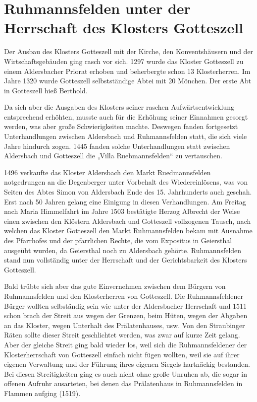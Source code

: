 \documentclass[12pt,a4paper]{book}
\begin{document}
\section[Unter dem Kloster Gotteszell]{Ruhmannsfelden unter der
Herrschaft des Klosters Gotteszell}

Der Ausbau des Klosters Gotteszell mit der Kirche, den Konventshäusern
und der Wirtschaftsgebäuden ging rasch vor sich. 1297 wurde das Kloster
Gotteszell zu einem Aldersbacher Priorat erhoben und beherbergte schon
13 Klosterherren. Im Jahre 1320 wurde Gotteszell selbstständige Abtei
mit 20 Mönchen. Der erste Abt in Gotteszell hieß Berthold.

Da sich aber die Ausgaben des Klosters seiner raschen
Aufwärtsentwicklung entsprechend erhöhten, musste auch für die Erhöhung
seiner Einnahmen gesorgt werden, was aber große Schwierigkeiten machte.
Deswegen fanden fortgesetzt Unterhandlungen zwischen Aldersbach und
Ruhmannsfelden statt, die sich viele Jahre hindurch zogen. 1445 fanden
solche Unterhandlungen statt zwischen Aldersbach und Gotteszell die
„Villa Ruebmannsfelden“ zu vertauschen.

1496 verkaufte das Kloster Aldersbach den Markt Ruedmannsfelden
notgedrungen an die Degenberger unter Vorbehalt des Wiedereinlösens, was
von Seiten des Abtes Simon von Aldersbach Ende des 15. Jahrhunderts auch
geschah. Erst nach 50 Jahren gelang eine Einigung in diesen
Verhandlungen. Am Freitag nach Maria Himmelfahrt im Jahre 1503
bestätigte Herzog Albrecht der Weise einen zwischen den Klöstern
Aldersbach und Gotteszell vollzogenen Tausch, nach welchen das Kloster
Gotteszell den Markt Ruhmannsfelden bekam mit Ausnahme des Pfarrhofes
und der pfarrlichen Rechte, die vom Expositus in Geiersthal ausgeübt
wurden, da Geiersthal noch zu Aldersbach gehörte. Ruhmannsfelden stand
nun vollständig unter der Herrschaft und der Gerichtsbarkeit des
Klosters Gotteszell.

Bald trübte sich aber das gute Einvernehmen zwischen dem Bürgern von
Ruhmannsfelden und den Klosterherren von Gotteszell. Die
Ruhmannsfeldener Bürger wollten selbständig sein wie unter der
Aldersbacher Herrschaft und 1511 schon brach der Streit aus wegen der
Grenzen, beim Hüten, wegen der Abgaben an das Kloster, wegen Unterhalt
des Prälatenhauses, usw. Von den Straubinger Räten sollte dieser Streit
geschlichtet werden, was zwar auf kurze Zeit gelang. Aber der gleiche
Streit ging bald wieder los, weil sich die Ruhmannsfeldener der
Klosterherrschaft von Gotteszell einfach nicht fügen wollten, weil sie
auf ihrer eigenen Verwaltung und der Führung ihres eigenen Siegels
hartnäckig bestanden. Bei diesen Streitigkeiten ging es auch nicht ohne
große Unruhen ab, die sogar in offenen Aufruhr ausarteten, bei denen das
Prälatenhaus in Ruhmannsfelden in Flammen aufging (1519).
\end{document}

